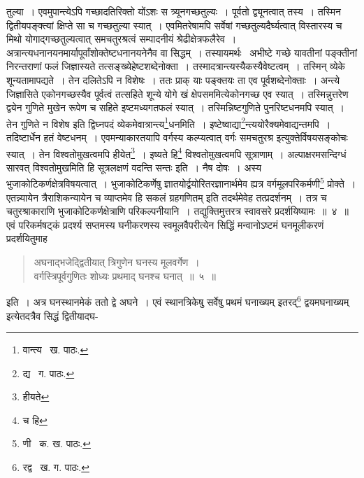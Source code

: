 \documentclass[11pt, openany]{book}
\begin{document}
{\newpage
\noindent तुल्या~। एवमुपान्त्येऽपि गच्छादतिरिक्तो योंऽशः स त्र्यूनगच्छतुल्यः~। पूर्वतो द्व्यूनत्वात् तस्य~। तस्मिन द्वितीयपङ्क्त्यां क्षिप्ते सा च गच्छतुल्या स्यात्~। एवमितरेषामपि सर्वेषां गच्छतुल्यदैर्घ्यत्वात् विस्तारस्य च मिथो योगाद्गच्छतुल्यत्वात् समचतुरश्रत्वं सम्पादनीयं श्रेढीक्षेत्रफलैरेव~। अत्रान्त्यधनानयनमार्यापूर्वांशोक्तेष्टधनानयनेनैव वा सिद्धम्~। तस्यायमर्थः \textendash\ अभीष्टे गच्छे यावतीनां पङ्क्तीनां निरन्तराणां फलं जिज्ञास्यते तत्सङ्ख्येहेष्टशब्देनोक्ता~। तस्मादत्रान्त्यस्यैकस्यैवेष्टत्वम्~। तस्मिन् व्येके शून्यतामापद्यते~। तेन दलितेऽपि न विशेषः~। ततः प्राक् याः पङ्क्तयः ता एव पूर्वशब्देनोक्ताः~। अन्त्ये जिज्ञासिते एकोनगच्छस्यैव पूर्वत्वं तत्सहिते शून्ये {\qt योगे खं क्षेपसममि}त्येकोनगच्छ एव स्यात्~। तस्मिन्नुत्तरेण द्वयेन गुणिते मुखेन रूपेण च सहिते इष्टमध्यगतफलं स्यात्~। तस्मिन्निष्टगुणिते पुनरिष्टधनमपि स्यात्~। तेन गुणिते न विशेष इति द्विघ्नपदं व्येकमेवात्रान्त्य\renewcommand{\thefootnote}{१}\footnote{वान्त्य \textendash\ ख. पाठः.}धनमिति~। इष्टेष्वाद्या\renewcommand{\thefootnote}{२}\footnote{द्य \textendash\ ग. पाठः.}न्त्ययोरैक्यमेवाद्यन्तमपि~। तदिष्टार्धेन हतं वेष्टधनम्~। एवमन्याकारतयापि वर्गस्य कल्प्यत्वात् वर्गः समचतुरश्र इत्युक्तेर्विषयसङ्कोचः स्यात्~। तेन विश्वतोमुखत्वमपि हीयेत\renewcommand{\thefootnote}{३}\footnote{हीयते}~। इष्यते हि\renewcommand{\thefootnote}{४}\footnote{च हि} विश्वतोमुखत्वमपि सूत्राणाम्~।} {\qt अल्पाक्षरमसन्दिग्धं सारवत् विश्वतोमुखमि}ति हि सूत्रलक्षणं वदन्ति सन्तः इति~। नैष दोषः~। अस्य भुजाकोटिकर्णक्षेत्रविषयत्वात्~। भुजाकोटिकर्णेषु ज्ञातयोर्द्वयोरितरज्ञानार्थमेव ह्यत्र वर्गमूलपरिकर्मणी\renewcommand{\thefootnote}{५}\footnote{णी \textendash\ क. ख. पाठः.} प्रोक्ते~। एतन्न्यायेन त्रैराशिकन्यायेन च व्याप्तमेव हि सकलं ग्रहगणितम् इति तदर्थमेवेह तत्प्रदर्शनम्~। तत्र च चतुरश्राकाराणि भुजाकोटिकर्णक्षेत्राणि परिकल्पनीयानि~। तद्युक्तिमुत्तरत्र स्वावसरे प्रदर्शयिष्यामः~॥~४~॥\\

एवं परिकर्मषट्कं प्रदर्श्य सप्तमस्य घनीकरणस्य स्वमूलवैपरीत्येन सिद्धिं मन्वानोऽष्टमं घनमूलीकरणं प्रदर्शयितुमाह\textendash 

\begin{quote}
{\ab अघनाद्भजेद्द्वितीयात् त्रिगुणेन घनस्य मूलवर्गेण~।\\
वर्गस्त्रिपूर्वगुणितः शोध्यः प्रथमाद् घनश्च घनात्~॥~५~॥}
\end{quote}

इति~। अत्र घनस्थानमेकं ततो द्वे अघने~। एवं स्थानत्रिकेषु सर्वेषु प्रथमं घनाख्यम् इतरद्\renewcommand{\thefootnote}{६}\footnote{रद्व \textendash\ ख. ग. पाठः.} द्वयमघनाख्यम् इत्येतदत्रैव सिद्धं द्वितीयादघ-
\end{document}
